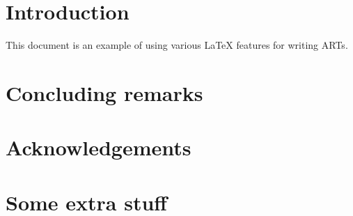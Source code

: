 \documentclass[
  a4paper,        %
  techreport,     %
]{art}
\begin{document}
\maketitle

\tableofcontents

\section{Introduction}

This document is an example of using various LaTeX features for writing ARTs.


%

\section{Concluding remarks}

\section{Acknowledgements}

\nocite{*} %


\appendix

\section{Some extra stuff}
\end{document}

